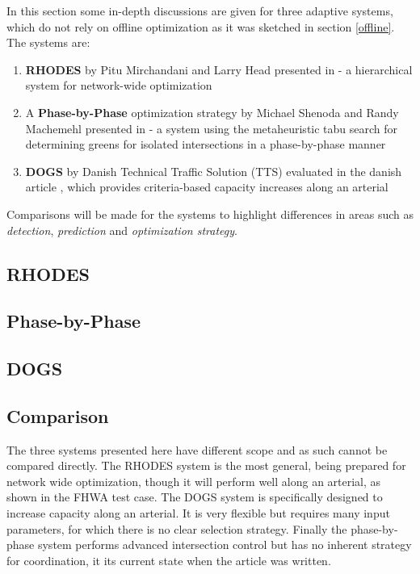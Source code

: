 In this section some in-depth discussions are given for three adaptive systems, which do not rely on offline optimization as it was sketched in section \ref{offline}. The systems are:

\begin{enumerate}
\item \textbf{RHODES} by Pitu Mirchandani and Larry Head presented in \cite{44} - a hierarchical system for network-wide optimization
\item A \textbf{Phase-by-Phase} optimization strategy by Michael Shenoda and Randy Machemehl presented in \cite{1} - a system using the metaheuristic tabu search for determining greens for isolated intersections in a phase-by-phase manner
\item \textbf{DOGS} by Danish Technical Traffic Solution (TTS) evaluated in the danish article \cite{dogs}, which provides criteria-based capacity increases along an arterial
\end{enumerate}

Comparisons will be made for the systems to highlight differences in areas such as \textit{detection}, \textit{prediction} and \textit{optimization strategy}.

\subsection{RHODES}


\subsection{Phase-by-Phase}


\subsection{DOGS}


\subsection{Comparison}
The three systems presented here have different scope and as such cannot be compared directly. The RHODES system is the most general, being prepared for network wide optimization, though it will perform well along an arterial, as shown in the FHWA test case. The DOGS system is specifically designed to increase capacity along an arterial. It is very flexible but requires many input parameters, for which there is no clear selection strategy. Finally the phase-by-phase system performs advanced intersection control but has no inherent strategy for coordination, it its current state when the article was written.


